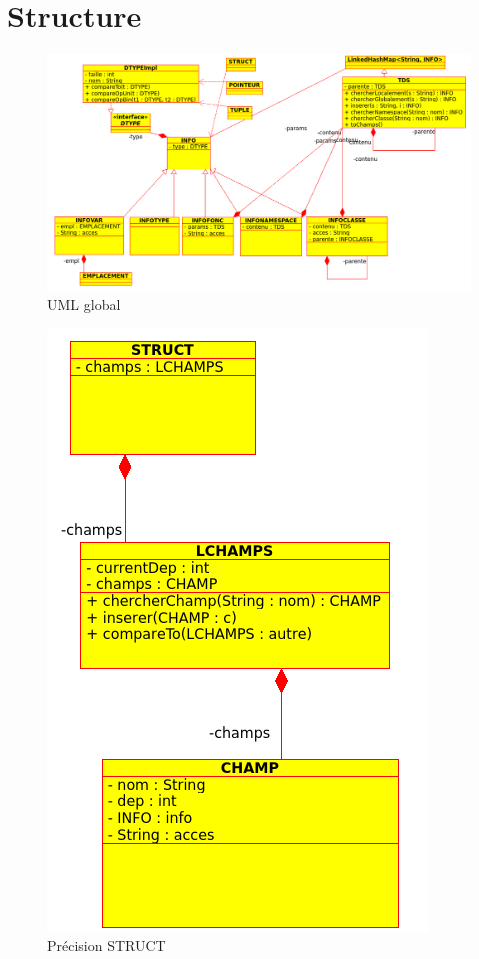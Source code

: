 \documentclass{report}
\begin{document}
\tableofcontents %

\vfill

\chapter{Structure}

	\begin{figure}[H]
		\begin{center}
			\includegraphics[scale=0.4]{UML.png}
		\end{center}
		\caption{UML global}
	\end{figure}
	
	\begin{figure}[H]
		\begin{center}
			\includegraphics[scale=0.4]{UMLSTRUCT.png}
		\end{center}
		\caption{Précision STRUCT}
	\end{figure}
\end{document}
